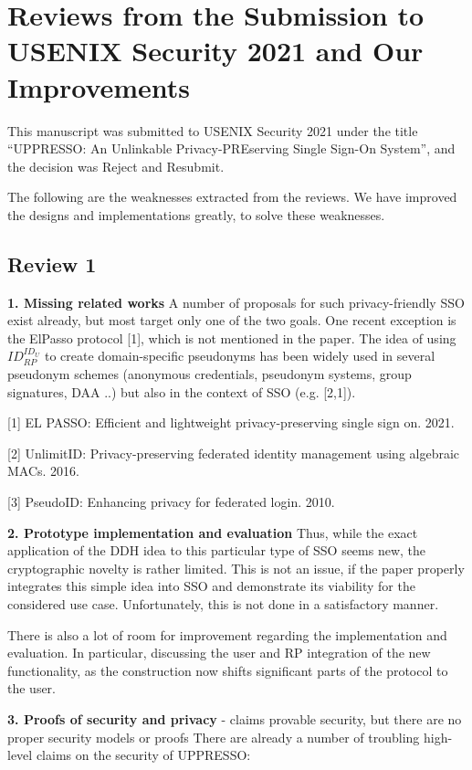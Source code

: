 \documentclass[letterpaper,onecolumn,10pt]{article}
\begin{document}
\section*{Reviews from the Submission to USENIX Security 2021 and Our Improvements}

This manuscript was submitted to USENIX Security 2021 under the title ``UPPRESSO: An Unlinkable Privacy-PREserving Single Sign-On System'',
     and the decision was Reject and Resubmit.

The following are the weaknesses extracted from the reviews.
We have improved the designs and implementations greatly, to solve these weaknesses.

\subsection*{Review 1}
\noindent\textbf{1. Missing related works}
A number of proposals for such privacy-friendly SSO exist already, but most target only one of the two goals.
One recent exception is the ElPasso protocol [1], which is not mentioned in the paper.
The idea of using $ID_{RP}^{ID_U}$ to create domain-specific pseudonyms has been widely used in several pseudonym schemes (anonymous credentials, pseudonym systems, group signatures, DAA ..) but also in the context of SSO (e.g. [2,1]).

[1] EL PASSO: Efficient and lightweight privacy-preserving single sign on. 2021.

[2] UnlimitID: Privacy-preserving federated identity management using algebraic MACs. 2016.

[3] PseudoID: Enhancing privacy for federated login. 2010.


\noindent\textbf{2. Prototype implementation and evaluation}
Thus, while the exact application of the DDH idea to this particular type of SSO seems new, the cryptographic novelty is rather limited.
This is not an issue, if the paper properly integrates this simple idea into SSO and demonstrate its viability for the considered use case.
Unfortunately, this is not done in a satisfactory manner.

There is also a lot of room for improvement regarding the implementation and evaluation. In particular, discussing the user and RP integration of the new functionality, as the construction now shifts significant parts of the protocol to the user.

\noindent\textbf{3. Proofs of security and privacy}
- claims provable security, but there are no proper security models or proofs
There are already a number of troubling high-level claims on the security of UPPRESSO:
\end{document}
